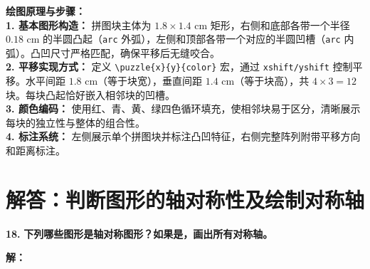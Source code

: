 \begin{center}
\end{center}

\vspace{0.4cm}
{\small\color{blue!70!black}
\textbf{绘图原理与步骤：}\\
\textbf{1. 基本图形构造：} 拼图块主体为 $1.8 \times 1.4$ cm 矩形，右侧和底部各带一个半径 $0.18$ cm 的半圆凸起（\texttt{arc} 外弧），左侧和顶部各带一个对应的半圆凹槽（\texttt{arc} 内弧）。凸凹尺寸严格匹配，确保平移后无缝咬合。\\
\textbf{2. 平移实现方式：} 定义 \texttt{\textbackslash{}puzzle\{x\}\{y\}\{color\}} 宏，通过 \texttt{xshift/yshift} 控制平移。水平间距 $1.8$ cm（等于块宽），垂直间距 $1.4$ cm（等于块高），共 $4 \times 3 = 12$ 块。每块凸起恰好嵌入相邻块的凹槽。\\
\textbf{3. 颜色编码：} 使用红、青、黄、绿四色循环填充，使相邻块易于区分，清晰展示每块的独立性与整体的组合性。\\
\textbf{4. 标注系统：} 左侧展示单个拼图块并标注凸凹特征，右侧完整阵列附带平移方向和距离标注。
}
\newpage



\section{解答：判断图形的轴对称性及绘制对称轴}

\vspace{0.6cm}

\textbf{\LARGE 18.} \textbf{下列哪些图形是轴对称图形？如果是，画出所有对称轴。}

\vspace{0.4cm}
\textbf{解：}

